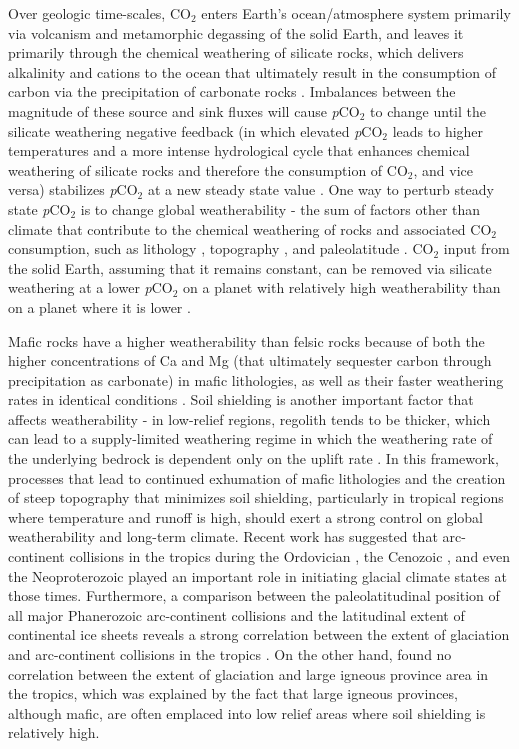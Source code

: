 \documentclass[11pt,letterpaper]{article}
\newcommand{\pCOtwo}{\textit{p}CO$_{2}$\xspace}
\newcommand{\COtwo}{CO$_{2}$\xspace}
\begin{document}
Over geologic time-scales, \COtwo enters Earth's ocean/atmosphere system primarily via volcanism and metamorphic degassing of the solid Earth, and leaves it primarily through the chemical weathering of silicate rocks, which delivers alkalinity and cations to the ocean that ultimately result in the consumption of carbon via the precipitation of carbonate rocks \citep{Kump2000a}. Imbalances between the magnitude of these source and sink fluxes will cause \pCOtwo to change until the silicate weathering negative feedback (in which elevated \pCOtwo leads to higher temperatures and a more intense hydrological cycle that enhances chemical weathering of silicate rocks and therefore the consumption of \COtwo, and vice versa) stabilizes \pCOtwo at a new steady state value \citep{Walker1981a}. One way to perturb steady state \pCOtwo is to change global weatherability - the sum of factors other than climate that contribute to the chemical weathering of rocks and associated \COtwo consumption, such as lithology \citep{Gaillardet1999a, Dessert2003a}, topography \citep{Maher2014a, Maffre2018a}, and paleolatitude \citep{Swanson-Hysell2017a}. \COtwo input from the solid Earth, assuming that it remains constant, can be removed via silicate weathering at a lower \pCOtwo on a planet with relatively high weatherability than on a planet where it is lower \citep{Kump1997a}.

Mafic rocks have a higher weatherability than felsic rocks because of both the higher concentrations of Ca and Mg (that ultimately sequester carbon through precipitation as carbonate) in mafic lithologies, as well as their faster weathering rates in identical conditions \citep{Dessert2001a, Dessert2003a}. Soil shielding is another important factor that affects weatherability - in low-relief regions, regolith tends to be thicker, which can lead to a supply-limited weathering regime in which the weathering rate of the underlying bedrock is dependent only on the uplift rate \citep{Gabet2009a, Maher2014a}. In this framework, processes that lead to continued exhumation of mafic lithologies and the creation of steep topography that minimizes soil shielding, particularly in tropical regions where temperature and runoff is high, should exert a strong control on global weatherability and long-term climate. Recent work has suggested that arc-continent collisions in the tropics during the Ordovician \citep{Swanson-Hysell2017a}, the Cenozoic \citep{Jagoutz2016a}, and even the Neoproterozoic \citep{Park2018a} played an important role in initiating glacial climate states at those times. Furthermore, a comparison between the paleolatitudinal position of all major Phanerozoic arc-continent collisions and the latitudinal extent of continental ice sheets reveals a strong correlation between the extent of glaciation and arc-continent collisions in the tropics \citep{Macdonald2019a}. On the other hand, \citet{Park2019a} found no correlation between the extent of glaciation and large igneous province area in the tropics, which was explained by the fact that large igneous provinces, although mafic, are often emplaced into low relief areas where soil shielding is relatively high.
\end{document}
